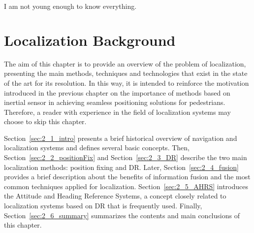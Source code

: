 



\begin{savequote}[50mm]
I am not young enough to know \mbox{everything}.
\end{savequote}

\chapter{Localization Background}
\label{cha:2_positioning}

\ifpdf
    \graphicspath{{2_positioning/figures/PNG/}{2_positioning/figures/PDF/}{2_positioning/figures/EPS/}}
\else
    \graphicspath{{2_positioning/figures/EPS/}{2_positioning/figures/}}
\fi

The aim of this chapter is to provide an overview of the problem of localization, presenting the main methods, techniques and technologies that exist in the state of the art for its resolution.
In this way, it is intended to reinforce the motivation introduced in the previous chapter on the importance of methods based on inertial sensor in achieving seamless positioning solutions for pedestrians.
Therefore, a reader with experience in the field of localization systems may choose to skip this chapter.

Section~\ref{sec:2_1_intro} presents a brief historical overview of navigation and localization systems and defines several basic concepts.
Then, Section~\ref{sec:2_2_positionFix} and Section~\ref{sec:2_3_DR} describe the two main localization methods: position fixing and DR.
Later, Section~\ref{sec:2_4_fusion} provides a brief description about the benefits of information fusion and the most common techniques applied for localization.
Section~\ref{sec:2_5_AHRS} introduces the Attitude and Heading Reference Systems, a concept closely related to localization systems based on DR that is frequently used.
Finally, Section~\ref{sec:2_6_summary} summarizes the contents and main conclusions of this chapter.
